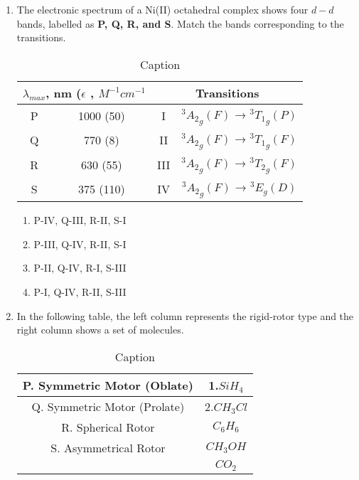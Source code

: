 \documentclass[12pt]{article}
\begin{document}
\begin{enumerate}
\item The electronic spectrum of a Ni(II) octahedral complex shows four $d-d$ bands,
labelled as \textbf{ P, Q, R, and S}. Match the bands corresponding to the transitions.


\begin{table}[H]
    \centering
    \begin{tabular}{|c|c|c|c|}\hline
         \multicolumn{2}{|c|}{${\lambda}_{max}$, nm ($\epsilon$ , $M^{-1}cm^{-1}$ }&
         \multicolumn{2}{|c|}{Transitions}\\ \hline
         P&   1000 (50)&  I& $^3{A_2}_g(F)$ → $^3{T_1}_g(P)$\\ \hline
         Q&  770 (8)&  II& $^3{A_2}_g(F)$ → $^3{T_1}_g(F)$\\ \hline
         R&  630 (55)&  III& $^3{A_2}_g(F)$ → $^3{T_2}_g(F)$\\ \hline
         S&   375 (110)&  IV& $^3{A_2}_g(F)$ → $^3{E}_g(D)$\\ \hline
    \end{tabular}
    \caption{Caption}
    \label{tab:placeholder}
\end{table}
    \begin{enumerate}
        \item P-IV, Q-III, R-II, S-I
        \item P-III, Q-IV, R-II, S-I
        \item P-II, Q-IV, R-I, S-III
        \item P-I, Q-IV, R-II, S-III
    \end{enumerate}


\item In the following table, the left column represents the rigid-rotor type and the right
column shows a set of molecules.


\begin{table}[H]
    \centering
    \begin{tabular}{|c|c|}
    \hline
          P. Symmetric Motor (Oblate)& 1.$SiH_4$\\ \hline
         Q. Symmetric Motor (Prolate)& 2.$CH_3Cl$\\ \hline
         R. Spherical Rotor& $C_6H_6$ \\ \hline
         S. Asymmetrical Rotor&$CH_3OH$ \\ \hline
         & $CO_2$\\
         \hline
    \end{tabular}
    \caption{Caption}
    \label{tab:placeholder}
\end{table}



\end{enumerate}
\end{document}

